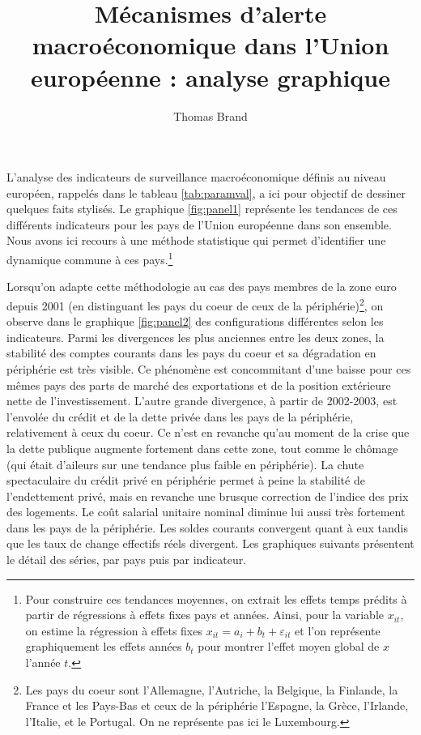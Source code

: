 \documentclass{article}\usepackage[]{graphicx}\usepackage[]{color}
\title{Mécanismes d'alerte macroéconomique dans l'Union européenne : analyse graphique}
\author{Thomas Brand}
\begin{document}
\maketitle


L'analyse des indicateurs de surveillance macroéconomique définis au niveau européen, rappelés dans le tableau \ref{tab:paramval}, a ici pour objectif de dessiner quelques faits stylisés. Le graphique \ref{fig:panel1} représente les tendances de ces différents indicateurs pour les pays de l'Union européenne dans son ensemble. Nous avons ici recours à une méthode statistique qui permet d'identifier une dynamique commune à ces pays.\footnote{Pour construire ces tendances moyennes, on extrait les effets temps prédits à partir de régressions à effets fixes pays et années. Ainsi, pour la variable $x_{it}$, on estime la régression à effets fixes $x_{it}=a_i+b_t+\varepsilon_{it}$ et l'on représente graphiquement les effets années $b_t$ pour montrer l'effet moyen global de $x$ l'année $t$.} 

Lorsqu'on adapte cette méthodologie au cas des pays membres de la zone euro depuis 2001 (en distinguant les pays du coeur de ceux de la périphérie)\footnote{Les pays du coeur sont l'Allemagne, l'Autriche, la Belgique, la Finlande, la France et les Pays-Bas et ceux de la périphérie l'Espagne, la Grèce, l'Irlande, l'Italie, et le Portugal. On ne représente pas ici le Luxembourg.}, on observe dans le graphique \ref{fig:panel2} des configurations différentes selon les indicateurs. Parmi les divergences les plus anciennes entre les deux zones, la stabilité des comptes courants dans les pays du coeur et sa dégradation en périphérie est très visible. Ce phénomène est concommitant d'une baisse pour ces mêmes pays des parts de marché des exportations et de la position extérieure nette de l'investissement. L'autre grande divergence, à partir de 2002-2003, est l'envolée du crédit et de la dette privée dans les pays de la périphérie, relativement à ceux du coeur. Ce n'est en revanche qu'au moment de la crise que la dette publique augmente fortement dans cette zone, tout comme le chômage (qui était d'aileurs sur une tendance plus faible en périphérie). La chute spectaculaire du crédit privé en périphérie permet à peine la stabilité de l'endettement privé, mais en revanche une brusque correction de l'indice des prix des logements. Le coût salarial unitaire nominal diminue lui aussi très fortement dans les pays de la périphérie. Les soldes courants convergent quant à eux tandis que les taux de change effectifs réels divergent. Les graphiques suivants présentent le détail des séries, par pays puis par indicateur.
\end{document}

